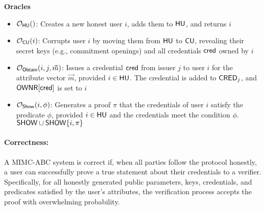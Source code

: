 \noindent\textbf{Oracles}
\begin{itemize}
    \item $\mathcal{O}_{\mathsf{HU}}()$: Creates a new honest user $i$, adds them to $\mathsf{HU}$, and returns $i$
    \item $\mathcal{O}_{\mathsf{CU}}(i)$: Corrupts user $i$ by moving them from $\mathsf{HU}$ to $\mathsf{CU}$, revealing their secret keys (e.g., commitment openings) and all credentials ${\mathsf{cred}}$ owned by $i$
    \item $\mathcal{O}_{\mathsf{Obtain}}(i, j, \vec{m})$: Issues a credential $\mathsf{cred}$ from issuer $j$ to user $i$ for the attribute vector $\vec{m}$, provided $i \in \mathsf{HU}$. The credential is added to $\mathsf{CRED}_j$, and $\mathsf{OWNR}[\mathsf{cred}]$ is set to $i$
    \item $\mathcal{O}_{\mathsf{Show}}(i, \phi)$: Generates a proof $\pi$ that the credentials of user $i$ satisfy the predicate $\phi$, provided $i \in \mathsf{HU}$ and the credentials meet the condition $\phi$. $\mathsf{SHOW} \cup \mathsf{SHOW} \{i, \pi\}$
\end{itemize} 


\paragraph{Correctness:} A MIMC-ABC system is correct if, when all parties follow the protocol honestly, a user can successfully prove a true statement about their credentials to a verifier. Specifically, for all honestly generated public parameters, keys, credentials, and predicates satisfied by the user’s attributes, the verification process accepts the proof with overwhelming probability. 

